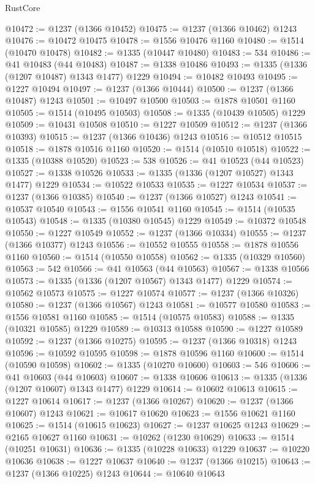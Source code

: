 \begin{lexlean}{RustCore}
\begin{coremodule}
@10472 := @1237 (@1366 @10452)
@10475 := @1237 (@1366 @10462) @1243
@10476 := @10472 @10475
@10478 := @1556 @10476 @1160
@10480 := @1514 (@10470 @10478)
@10482 := @1335 (@10447 @10480)
@10483 := 534
@10486 := @41 @10483 (@44 @10483)
@10487 := @1338 @10486
@10493 := @1335 (@1336 (@1207 @10487) @1343 @1477) @1229
@10494 := @10482 @10493
@10495 := @1227 @10494
@10497 := @1237 (@1366 @10444)
@10500 := @1237 (@1366 @10487) @1243
@10501 := @10497 @10500
@10503 := @1878 @10501 @1160
@10505 := @1514 (@10495 @10503)
@10508 := @1335 (@10439 @10505) @1229
@10509 := @10431 @10508
@10510 := @1227 @10509
@10512 := @1237 (@1366 @10393)
@10515 := @1237 (@1366 @10436) @1243
@10516 := @10512 @10515
@10518 := @1878 @10516 @1160
@10520 := @1514 (@10510 @10518)
@10522 := @1335 (@10388 @10520)
@10523 := 538
@10526 := @41 @10523 (@44 @10523)
@10527 := @1338 @10526
@10533 := @1335 (@1336 (@1207 @10527) @1343 @1477) @1229
@10534 := @10522 @10533
@10535 := @1227 @10534
@10537 := @1237 (@1366 @10385)
@10540 := @1237 (@1366 @10527) @1243
@10541 := @10537 @10540
@10543 := @1556 @10541 @1160
@10545 := @1514 (@10535 @10543)
@10548 := @1335 (@10380 @10545) @1229
@10549 := @10372 @10548
@10550 := @1227 @10549
@10552 := @1237 (@1366 @10334)
@10555 := @1237 (@1366 @10377) @1243
@10556 := @10552 @10555
@10558 := @1878 @10556 @1160
@10560 := @1514 (@10550 @10558)
@10562 := @1335 (@10329 @10560)
@10563 := 542
@10566 := @41 @10563 (@44 @10563)
@10567 := @1338 @10566
@10573 := @1335 (@1336 (@1207 @10567) @1343 @1477) @1229
@10574 := @10562 @10573
@10575 := @1227 @10574
@10577 := @1237 (@1366 @10326)
@10580 := @1237 (@1366 @10567) @1243
@10581 := @10577 @10580
@10583 := @1556 @10581 @1160
@10585 := @1514 (@10575 @10583)
@10588 := @1335 (@10321 @10585) @1229
@10589 := @10313 @10588
@10590 := @1227 @10589
@10592 := @1237 (@1366 @10275)
@10595 := @1237 (@1366 @10318) @1243
@10596 := @10592 @10595
@10598 := @1878 @10596 @1160
@10600 := @1514 (@10590 @10598)
@10602 := @1335 (@10270 @10600)
@10603 := 546
@10606 := @41 @10603 (@44 @10603)
@10607 := @1338 @10606
@10613 := @1335 (@1336 (@1207 @10607) @1343 @1477) @1229
@10614 := @10602 @10613
@10615 := @1227 @10614
@10617 := @1237 (@1366 @10267)
@10620 := @1237 (@1366 @10607) @1243
@10621 := @10617 @10620
@10623 := @1556 @10621 @1160
@10625 := @1514 (@10615 @10623)
@10627 := @1237 @10625 @1243
@10629 := @2165 @10627 @1160
@10631 := @10262 (@1230 @10629)
@10633 := @1514 (@10251 @10631)
@10636 := @1335 (@10228 @10633) @1229
@10637 := @10220 @10636
@10638 := @1227 @10637
@10640 := @1237 (@1366 @10215)
@10643 := @1237 (@1366 @10225) @1243
@10644 := @10640 @10643

\end{coremodule}
\end{lexlean}
